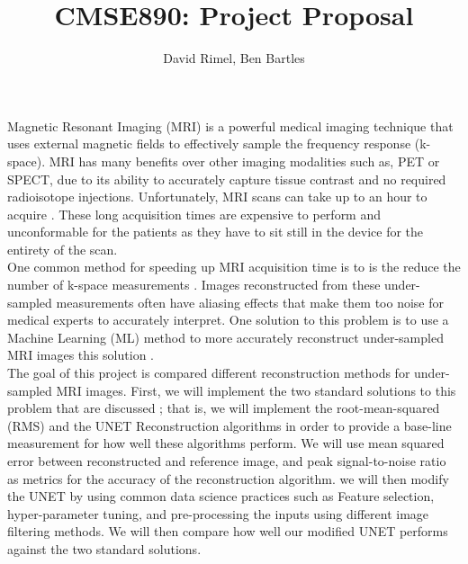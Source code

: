 \documentclass[12pt]{article}
\begin{document}
 
 
\title{CMSE890: Project Proposal}
\author{David Rimel, Ben Bartles}
\maketitle

Magnetic Resonant Imaging (MRI) is a powerful medical imaging technique that uses external magnetic fields to effectively sample the frequency response (k-space). MRI has many benefits over other imaging modalities such as, PET or SPECT, due to its ability to accurately capture tissue contrast and no required radioisotope injections. Unfortunately, MRI scans can take up to an hour to acquire \cite{Zhang_2019_CVPR}. These long acquisition times are expensive to perform and unconformable for the patients as they have to sit still in the device for the entirety of the scan.\\

One common method for speeding up MRI acquisition time is to is the reduce the number of k-space measurements \cite{fastMRI}. Images reconstructed from these under-sampled measurements often have aliasing effects that make them too noise for medical experts to accurately interpret. One solution to this problem is to use a Machine Learning (ML) method to more accurately reconstruct under-sampled MRI images this solution \cite{fastMRI}.\\

The goal of this project is compared different reconstruction methods for under-sampled MRI images.
First, we will implement the two standard solutions to this problem that are discussed \cite{fastMRI}; that is, we will implement the root-mean-squared (RMS) and the UNET Reconstruction algorithms in order to provide a base-line measurement for how well these algorithms perform. We will use  mean squared error between reconstructed and reference image, and peak signal-to-noise ratio as metrics for the accuracy of the reconstruction algorithm. we will then modify the UNET by using common data science practices such as Feature selection, hyper-parameter tuning, and pre-processing the inputs using different image filtering methods. We will then compare how well our modified UNET performs against the two standard solutions.




\printbibliography
\end{document}
